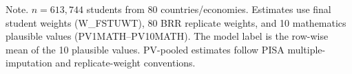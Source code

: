 \begin{table}[htp]
\centering
\caption{Weighted descriptive estimates using BRR replicate-weight and plausible-value standard errors\label{tab:descriptive}}
\begin{tablenotes}
\item Note. $n = 613{,}744$ students from 80 countries/economies. Estimates use final student weights (W\_FSTUWT), 80 BRR replicate weights, and 10 mathematics plausible values (PV1MATH--PV10MATH). The model label is the row-wise mean of the 10 plausible values. PV-pooled estimates follow PISA multiple-imputation and replicate-weight conventions.
\end{tablenotes}
\end{table}

